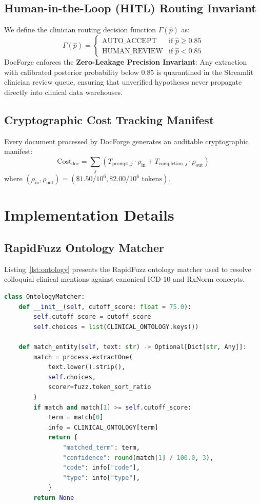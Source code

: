 \documentclass[10pt,journal,compsoc]{IEEEtran}
\begin{document}
\subsection{Human-in-the-Loop (HITL) Routing Invariant}
We define the clinician routing decision function $\Gamma(\hat{p})$ as:
\begin{equation}
\Gamma(\hat{p}) = \begin{cases}
\text{AUTO\_ACCEPT} & \text{if } \hat{p} \ge 0.85 \\
\text{HUMAN\_REVIEW} & \text{if } \hat{p} < 0.85
\end{cases}
\end{equation}
DocForge enforces the \textbf{Zero-Leakage Precision Invariant}: Any extraction with calibrated posterior probability below 0.85 is quarantined in the Streamlit clinician review queue, ensuring that unverified hypotheses never propagate directly into clinical data warehouses.

\subsection{Cryptographic Cost Tracking Manifest}
Every document processed by DocForge generates an auditable cryptographic manifest:
\begin{equation}
\text{Cost}_{\text{doc}} = \sum_{j} \left( T_{\text{prompt}, j} \cdot \rho_{\text{in}} + T_{\text{completion}, j} \cdot \rho_{\text{out}} \right)
\end{equation}
where $(\rho_{\text{in}}, \rho_{\text{out}}) = (\$1.50/10^6, \$2.00/10^6\text{ tokens})$.

\section{Implementation Details}
\subsection{RapidFuzz Ontology Matcher}
Listing~\ref{lst:ontology} presents the RapidFuzz ontology matcher used to resolve colloquial clinical mentions against canonical ICD-10 and RxNorm concepts.

\begin{lstlisting}[language=Python, caption={RapidFuzz Clinical Ontology Matcher.}, label={lst:ontology}]
class OntologyMatcher:
    def __init__(self, cutoff_score: float = 75.0):
        self.cutoff_score = cutoff_score
        self.choices = list(CLINICAL_ONTOLOGY.keys())

    def match_entity(self, text: str) -> Optional[Dict[str, Any]]:
        match = process.extractOne(
            text.lower().strip(), 
            self.choices, 
            scorer=fuzz.token_sort_ratio
        )
        if match and match[1] >= self.cutoff_score:
            term = match[0]
            info = CLINICAL_ONTOLOGY[term]
            return {
                "matched_term": term,
                "confidence": round(match[1] / 100.0, 3),
                "code": info["code"],
                "type": info["type"],
            }
        return None
\end{lstlisting}
\end{document}
